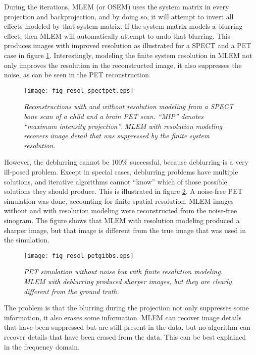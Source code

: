 During the iterations, MLEM (or OSEM) uses the system matrix in every
projection and backprojection, and by doing so, it will attempt to
invert all effects modeled by that system matrix. If the system matrix
models a blurring effect, then MLEM will automatically attempt to undo
that blurring. This produces images with improved resolution as
illustrated for a SPECT and a PET case in figure
\ref{fig:resolspectpet}. Interestingly, modeling the finite system
resolution in MLEM not only improves the resolution in the
reconstructed image, it also suppresses the noise, as can be seen in
the PET reconstruction.

\begin{figure}[htb]
\centering
\texttt{[image: fig\_resol\_spectpet.eps]}
\caption{\label{fig:resolspectpet} \emph{Reconstructions with and
    without resolution modeling from a SPECT bone scan of a child and
    a brain PET scan. ``MIP'' denotes ``maximum intensity
    projection''.  MLEM with resolution modeling recovers image detail
    that was suppressed by the finite system resolution.}}
\end{figure}

However, the deblurring cannot be 100\% successful, because deblurring
is a very ill-posed problem. Except in special cases, deblurring
problems have multiple solutions, and iterative algorithms cannot
``know'' which of those possible solutions they should produce. This
is illustrated in figure \ref{fig:resolpetgibbs}. A noise-free PET
simulation was done, accounting for finite spatial resolution. MLEM
images without and with resolution modeling were reconstructed from
the noise-free sinogram. The figure shows that MLEM with resolution
modeling produced a sharper image, but that image is different from
the true image that was used in the simulation. 
\begin{figure}[htb]
\centering
\texttt{[image: fig\_resol\_petgibbs.eps]}
\caption{\label{fig:resolpetgibbs} \emph{PET simulation without noise
    but with finite resolution modeling. MLEM with deblurring produced
    sharper images, but they are clearly different from the ground truth.}}
\end{figure}

The problem is that the blurring during the projection not only
suppresses some information, it also erases some information. MLEM can
recover image details that have been suppressed but are still present
in the data, but no algorithm can recover details that have been
erased from the data. This can be best explained in the frequency
domain.

